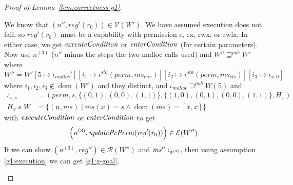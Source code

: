 \documentclass[a4paper]{article}
\newcommand{\update}[2]{[#1 \mapsto #2]}
\DeclareMathOperator{\dom}{dom}
\newcommand{\var}[1]{\mathit{#1}}
\newcommand{\hs}{\var{ms}}
\newcommand{\ms}{\hs}
\newcommand{\reg}{\var{reg}}
\newcommand{\heap}{\var{mem}}
\newcommand{\perm}{\var{perm}}
\newcommand{\sta}{\var{sta}}
\newcommand{\plainfun}[2]{
  \ifthenelse{\equal{#2}{}}
  {\mathit{#1}}
  {\mathit{#1}(#2)}
}
\newcommand{\updatePcPerm}[1]{\plainfun{updatePcPerm}{#1}}
\newcommand{\execCond}[1]{\plainfun{executeCondition}{#1}}
\newcommand{\entryCond}[1]{\plainfun{enterCondition}{#1}}
\newcommand{\futurewk}{\mathbin{\sqsupseteq}^{\var{pub}}}
\newcommand{\heapSat}[3][\heap]{#1 :_{#2} #3}
\newcommand{\memSat}[3][n]{\heapSat[#2]{#1}{#3}}
\newcommand{\codelabel}[1]{\mathit{#1}}
\newcommand{\malloc}{\codelabel{malloc}}
\newcommand{\asmType}{\plaindom{AsmType}}
\newcommand{\plaindom}[1]{\mathrm{#1}}
\newcommand{\intr}[2]{\mathcal{#1}}
\newcommand{\valueintr}[1]{\intr{V}{#1}}
\newcommand{\exprintr}[1]{\intr{E}{#1}}
\newcommand{\regintr}[1]{\intr{R}{#1}}
\newcommand{\stdvr}{\valueintr{\asmType}}
\newcommand{\stder}{\exprintr{\asmType}}
\newcommand{\stdrr}{\regintr{\asmType}}
\newcommand{\npair}[2][n]{\left(#1,#2 \right)}
\newcommand{\plainperm}[1]{\mathrm{#1}}
\newcommand{\exec}{\plainperm{rx}}
\newcommand{\entry}{\plainperm{e}}
\newcommand{\rwx}{\plainperm{rwx}}
\newcommand{\rwlx}{\plainperm{rwlx}}
\begin{document}
\begin{lemma}
\begin{proof}[Proof of Lemma~\ref{lem:correctness-g1}]
\begin{enumproof}
\begin{enumproof}
\[      \]
      We know that $\npair[n'']{\reg'(r_0)} \in \stdvr(W')$. We have assumed execution does not fail, so $\reg'(r_0)$ must be a capability with permission $\entry$, $\exec$, $\rwx$, or $\rwlx$. In either case, we get $\execCond{}$ or $\entryCond{}$ (for certain parameters). Now use $n^{(3)}$ ($n''$ minus the steps the two malloc calls used) and $W'' \futurewk W'$ where
      \[
        W'' = W'\update{5}{\iota_\malloc'}
        \update{i_1}{\iota^\sta (\perm,\ms_{\var{env}})}
        \update{i_2}{\iota^\sta (\perm,\ms_{\var{cls}})}
        \update{i_3}{\iota_{x,0}}
      \]
      where $i_1,i_2,i_3 \not\in\dom(W')$ and they distinct, and $\iota_\malloc \futurewk W(5)$ and
      \begin{align*}
        \iota_{x,s} & = (\perm,s,\{(0,1),(0,0),(1,1)\},\{(1,0),(0,1),(0,0),(1,1)\},H_x) \\
        H_x \; s \; W & = \{\npair{\ms} \mid \ms(x) = s \land \dom(\ms) = [x,x]\}
      \end{align*}
      with $\execCond{}$ or $\entryCond{}$ to get
      \[
        \npair[n^{(3)}]{\updatePcPerm{\reg'(r_0)}} \in \stder(W'')
      \]
      If we can show $\npair[n^{(3)}]{\reg''} \in \stdrr(W'')$ and $\memSat[n^{(3)}]{\ms''}$, then using assumption \ref{g1:execution} we can get \ref{g1:g-goal}.


\end{enumproof}
\end{enumproof}
\end{proof}
\end{lemma}
\end{document}
